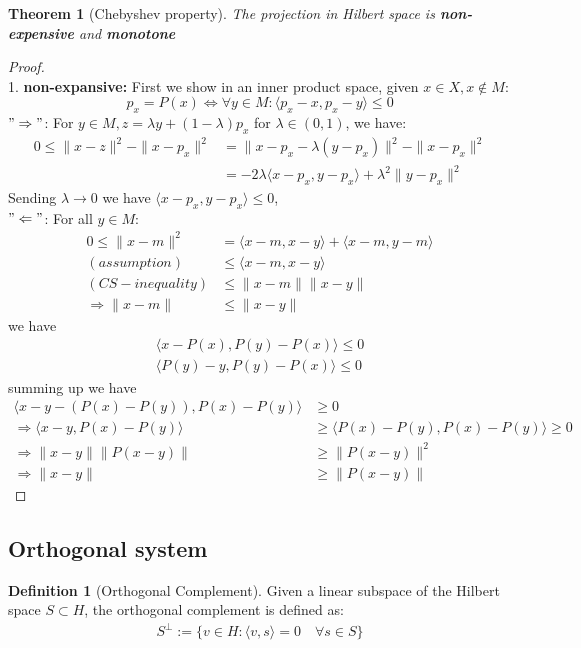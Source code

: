 \documentclass[a4paper,11pt,fleqn]{book}
\newtheorem{theorem}{Theorem}[section]
\theoremstyle{definition}
\newtheorem{definition}{Definition}[section]
\theoremstyle{remark}
\begin{document}
\begin{theorem}[Chebyshev property]
	The projection in Hilbert space is \textbf{non-expensive} and \textbf{monotone}
\end{theorem}
\begin{proof}\quad\\
1. \textbf{non-expansive:} First we show in an inner product space,  given $x \in X, x \notin M$:
 \begin{equation}
 	p_x = P(x) \Leftrightarrow  \forall y \in M: \langle p_x - x, p_x - y \rangle \le 0
 \end{equation} 
$"\Rightarrow"$: For $y \in M, z = \lambda y + (1-\lambda) p_x $ for $\lambda \in (0, 1)$, we have:
\begin{align*}
	0 \le \|x - z\|^2 - \|x - p_x\|^2 &= \|x - p_x - \lambda(y - p_x)\|^2 - \|x - p_x\|^2 \\
	&= - 2\lambda\langle x - p_x, y- p_x\rangle+ \lambda^2 \|y - p_x\|^2
\end{align*}    
Sending $\lambda \rightarrow 0$ we have $\langle x - p_x, y - p_x \rangle \le 0$,  \\
$"\Leftarrow"$: For all $y \in M:$
\begin{align*}
	0 \le \|x - m \|^2 &= \langle x - m, x- y\rangle + \langle x - m, y - m\rangle\\
(assumption)
	&\le \langle x - m, x - y\rangle\\
(CS-inequality)
	&\le \|x - m\| \|x - y\|\\
	\Rightarrow \|x - m\| &\le \|x - y\|
\end{align*}
we have
\begin{align*}
	\langle x - P(x), P(y) - P(x) \rangle \le 0\\
	\langle P(y) - y, P(y) - P(x) \rangle \le 0 
\end{align*}
summing up we have
\begin{align*}
	\langle x - y  - (P(x) - P(y)), P(x) - P(y) \rangle &\geq 0\\
	\Rightarrow \langle x - y, P(x) - P(y)\rangle &\geq \langle P(x) - P(y), P(x)-P(y) \rangle \ge 0\\
	\Rightarrow \|x -y \|\|P(x - y)\| & \geq \|P(x-y)\|^2\\
	\Rightarrow \|x-y\| & \geq \|P(x -y)\|
\end{align*}
\end{proof}


\subsection{Orthogonal system}
\begin{definition}[Orthogonal Complement]
	Given a linear subspace of the Hilbert space $S \subset H$, the orthogonal complement is defined as:
	\begin{align*}
		S^\perp := \{ v \in H: \langle v, s \rangle = 0 \quad \forall s \in S \}
	\end{align*}
\end{definition}
\end{document}
